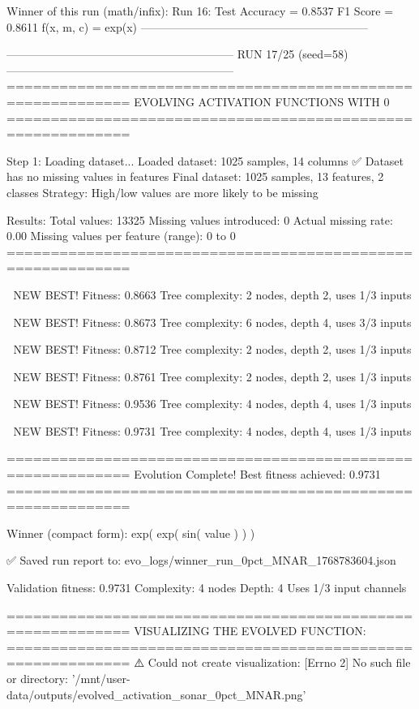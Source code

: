 Winner of this run (math/infix):
  Run 16:
     Test Accuracy = 0.8537
     F1 Score      = 0.8611
     f(x, m, c)    = exp(x)
------------------------------------------------------------

------------------------------------------------------------
RUN 17/25 (seed=58)
------------------------------------------------------------
============================================================
EVOLVING ACTIVATION FUNCTIONS
WITH 0%
============================================================

Step 1: Loading dataset...
Loaded dataset: 1025 samples, 14 columns
✅ Dataset has no missing values in features
Final dataset: 1025 samples, 13 features, 2 classes
Strategy: High/low values are more likely to be missing

Results:
  Total values: 13325
  Missing values introduced: 0
  Actual missing rate: 0.00%
  Missing values per feature (range): 0 to 0
============================================================


🎯 NEW BEST! Fitness: 0.8663
Tree complexity: 2 nodes, depth 2, uses 1/3 inputs

🎯 NEW BEST! Fitness: 0.8673
Tree complexity: 6 nodes, depth 4, uses 3/3 inputs

🎯 NEW BEST! Fitness: 0.8712
Tree complexity: 2 nodes, depth 2, uses 1/3 inputs

🎯 NEW BEST! Fitness: 0.8761
Tree complexity: 2 nodes, depth 2, uses 1/3 inputs

🎯 NEW BEST! Fitness: 0.9536
Tree complexity: 4 nodes, depth 4, uses 1/3 inputs

🎯 NEW BEST! Fitness: 0.9731
Tree complexity: 4 nodes, depth 4, uses 1/3 inputs

============================================================
Evolution Complete!
Best fitness achieved: 0.9731
============================================================

Winner (compact form):
 exp(
  exp(
    sin(
      value
    )
  )
)

✅ Saved run report to: evo_logs/winner_run_0pct_MNAR_1768783604.json

Validation fitness: 0.9731
Complexity: 4 nodes
Depth: 4
Uses 1/3 input channels

============================================================
VISUALIZING THE EVOLVED FUNCTION:
============================================================
⚠️ Could not create visualization: [Errno 2] No such file or directory: '/mnt/user-data/outputs/evolved_activation_sonar_0pct_MNAR.png'

